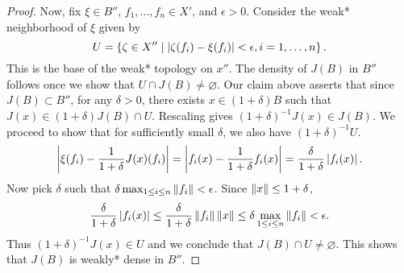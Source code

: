 \begin{proof}
    Now, fix $\xi\in B''$, $f_1,\ldots,f_n\in X'$, and $\epsilon>0$. 
    Consider the weak* neighborhood of $\xi$ given by 
    \begin{equation*}
        U = \left\{ \zeta\in X'' \;\middle\vert\; \left\lvert {\zeta(f_i) - \xi(f_i)} \right\rvert<\epsilon, i=1,\ldots,n \right\}.
    \end{equation*}
    This is the base of the weak* topology on $x''$. The density 
    of $J(B)$ in $B''$ follows once we show that $U\cap J(B)\neq\varnothing$. 
    Our claim above asserts that since $J(B)\subset B''$, for any 
    $\delta>0$, there exists $x\in (1+\delta)B$ such that $J(x)\in (1+\delta)J(B)\cap U$. 
    Rescaling gives $(1+\delta)^{-1}J(x)\in J(B)$. We proceed to show that 
    for sufficiently small $\delta$, we also have $(1+\delta)^{-1} U$. 
    \begin{equation*}
        \left\lvert {\xi(f_i) - \frac{1}{1+\delta}J(x)(f_i)} \right\rvert 
        = \left\lvert {f_i(x) - \frac{1}{1+\delta}f_i(x)} \right\rvert  
        = \frac{\delta}{1+\delta}\left\lvert {f_i(x)} \right\rvert.
    \end{equation*}
    Now pick $\delta$ such that $\delta\max_{1\leq i\leq n}\left\lVert {f_i} \right\rVert<\epsilon$. 
    Since $\left\lVert {x} \right\rVert\leq 1+\delta$, 
    \begin{equation*}
        \frac{\delta}{1+\delta}\left\lvert {f_i(x)} \right\rvert \leq \frac{\delta}{1+\delta}\left\lVert {f_i} \right\rVert\left\lVert {x} \right\rVert 
        \leq \delta\max_{1\leq i\leq n}\left\lVert {f_i} \right\rVert < \epsilon.
    \end{equation*}
    Thus $(1+\delta)^{-1}J(x)\in U$ and we conclude that $J(B)\cap U\neq\varnothing$. 
    This shows that $J(B)$ is weakly* dense in $B''$.
\end{proof}

